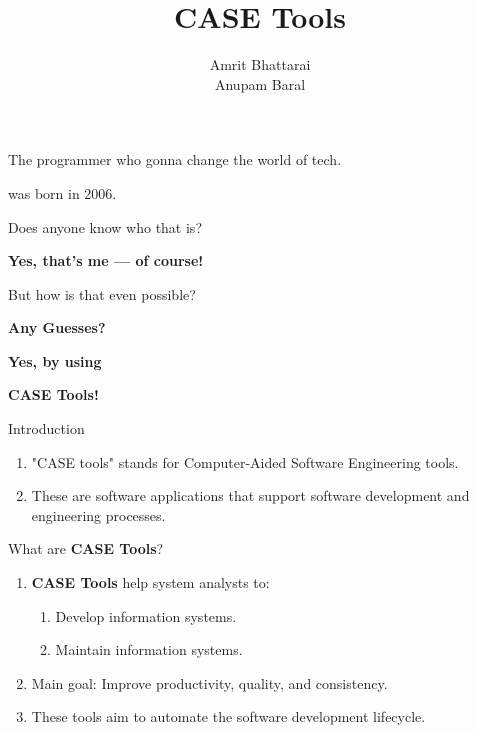 \documentclass[14pt, aspectratio=169]{beamer}
\title{CASE Tools}
\author{Amrit Bhattarai\\Anupam Baral}
\begin{document}
\maketitle

\begin{frame}[plain]{}
	\vfill
	\centering
	{\Huge The programmer who gonna change the world of tech.} \par \pause
	\vspace{1em}
	{\LARGE was born in \textcolor{alert}{2006}.} \par \pause
	\vspace{1em}
	{\large Does anyone know who that is?} \par \pause
	\vspace{1em}
	{\Huge \textbf{Yes, that’s me — of course!}}
	\vfill
\end{frame}

\begin{frame}[plain]{}
	\vfill
	\centering
	{\Huge But how is that even possible?} \par \pause
	\vspace{2em}
	{\Huge \textbf{Any Guesses?}}
	\vfill
\end{frame}

\begin{frame}[plain]{}
	\vfill
	\centering
	{\Huge \textbf{Yes, by using}} \par
	\vspace{1em}
	{\Huge \textbf{\textcolor{alert}{CASE Tools!}}}
	\vfill
\end{frame}

\begin{frame}{Introduction}
	\begin{enumerate}
		\item<1-> "CASE tools" stands for \textcolor{alert}{Computer-Aided Software Engineering} tools. \pause
		\item<2-> These are software applications that support software development and engineering processes.
	\end{enumerate}
\end{frame}


\begin{frame}{What are \textbf{CASE Tools}?}
	\begin{enumerate}
		\item<1-> \textbf{CASE Tools} help system analysts to:
			\begin{enumerate}
				\item Develop information systems.
				\item Maintain information systems. \pause
			\end{enumerate}
		\item<2-> Main goal: \textcolor{alert}{Improve productivity, quality, and consistency}.
		\item<3-> These tools aim to \textcolor{alert}{automate} the software development lifecycle.
	\end{enumerate}
\end{frame}
\end{document}
